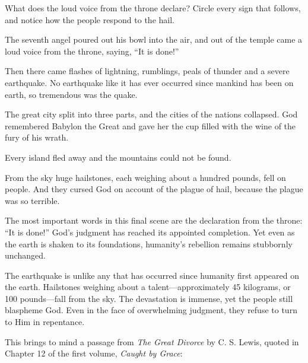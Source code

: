 \begin{ScriptureBox2}{What does the loud voice from the throne declare? Circle every sign that follows, and notice how the people respond to the hail.}

\item[16:17] The seventh angel poured out his bowl into the air, and out of the temple came a loud voice from the throne, saying, ``It is done!''

\item[16:18] Then there came flashes of lightning, rumblings, peals of thunder and a severe earthquake. No earthquake like it has ever occurred since mankind has been on earth, so tremendous was the quake.

\item[16:19] The great city split into three parts, and the cities of the nations collapsed. God remembered Babylon the Great and gave her the cup filled with the wine of the fury of his wrath.

\item[16:20] Every island fled away and the mountains could not be found.

\item[16:21] From the sky huge hailstones, each weighing about a hundred pounds, fell on people. And they cursed God on account of the plague of hail, because the plague was so terrible.

\end{ScriptureBox2}

The most important words in this final scene are the declaration from the throne: “It is done!” God's judgment has reached its appointed completion. Yet even as the earth is shaken to its foundations, humanity's rebellion remains stubbornly unchanged.

The earthquake is unlike any that has occurred since humanity first appeared on the earth. Hailstones weighing about a talent—approximately 45 kilograms, or 100 pounds—fall from the sky. The devastation is immense, yet the people still blaspheme God. Even in the face of overwhelming judgment, they refuse to turn to Him in repentance.

This brings to mind a passage from \textit{The Great Divorce} by C. S. Lewis, quoted in Chapter 12 of the first volume, \textit{Caught by Grace}:

